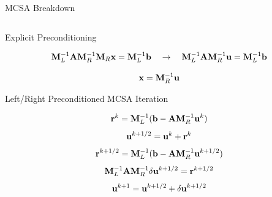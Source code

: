 \documentclass{beamer}
\begin{document}
\begin{frame}{MCSA Breakdown}
\begin{columns}
\begin{column}{0.5\textwidth}
    \end{column}

  \end{columns}

\end{frame}

\begin{frame}{Explicit Preconditioning}

  \[
  \ve{M}_L^{-1}\ve{A}\ve{M}_R^{-1}\ve{M}_R\ve{x} = \ve{M}_L^{-1}\ve{b}
  \ \ \ \rightarrow \ \ \ 
  \ve{M}_L^{-1}\ve{A}\ve{M}_R^{-1}\ve{u} = \ve{M}_L^{-1}\ve{b}
  \]

  \[
  \mathbf{x} = \mathbf{M}_R^{-1}\mathbf{u}
  \]

  \begin{beamerboxesrounded}[upper=boxheadcolor,lower=boxbodycolor,shadow=true]
    {Left/Right Preconditioned MCSA Iteration}

    \[
    \mathbf{r}^{k} = \mathbf{M}_L^{-1}(\mathbf{b}-\mathbf{A}\mathbf{M}_R^{-1}\mathbf{u}^{k})
    \]
    \[
    \mathbf{u}^{k+1/2} = \mathbf{u}^k + \mathbf{r}^k
    \]
    \[
    \mathbf{r}^{k+1/2} = \mathbf{M}_L^{-1}(\mathbf{b}-\mathbf{A}\mathbf{M}_R^{-1}\mathbf{u}^{k+1/2})
    \]
    \[
    \mathbf{M}_L^{-1}\mathbf{A}\mathbf{M}_R^{-1}\delta\mathbf{u}^{k+1/2} = \mathbf{r}^{k+1/2}
    \]
    \[
    \mathbf{u}^{k+1} = \mathbf{u}^{k+1/2} + \delta \mathbf{u}^{k+1/2}
    \]

  \end{beamerboxesrounded}

\end{frame}
\end{document}
